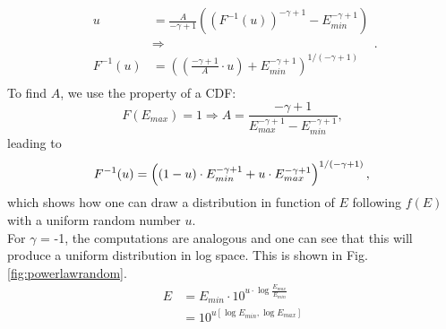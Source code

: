 \begin{appendices}
\begin{equation}
\begin{split}
u &= \frac{A}{-\gamma+1}\left(\left(F^{-1}(u)\right)^{-\gamma+1}-E_{min}^{-\gamma+1}\right)\\
&\Rightarrow \\
            F^{-1}(u) &= \left(\left(\frac{-\gamma+1}{A}\cdot u\right)+ E_{min}^{-\gamma+1}\right)^{1/(-\gamma+1)}\\
\end{split}.
\end{equation}
To find $A$, we use the property of a CDF:
\begin{equation}
F(E_{max}) = 1\Rightarrow A = \frac{-\gamma+1}{E_{max}^{-\gamma+1}-E_{min}^{-\gamma+1}},
\end{equation}
\noindent leading to
\begin{equation}
F^{-1}(u) = \left((1-u) \cdot E_{min}^{-\gamma+1} + u \cdot E_{max}^{-\gamma+1}\right)^{1/(-\gamma+1)},\\
\end{equation}
\noindent which shows how one can draw a distribution in function of $E$ following $f(E)$ with a uniform random number $u$.\\

\noindent For $\gamma$ = -1, the computations are analogous and one can see that this will produce a uniform distribution in log space. This is shown in Fig. \ref{fig:powerlawrandom}.
            \begin{equation}
            \begin{split}
            E &= E_{min} \cdot 10^{u\cdot \log{\frac{E_{max}}{E_{min}}}}\\
            &= 10^{u[\log{E_{min}},\log{E_{max}}]}
\end{split}
\end{equation}
            

\end{appendices}
